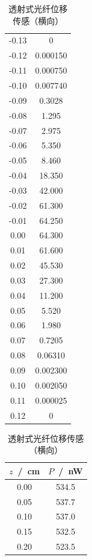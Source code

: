 \documentclass[a4paper]{article}%
\begin{document}
\begin{table}[H]
\begin{minipage}{0.29\linewidth}
\begin{tabular}{cc}
          \midrule
          -0.13 	&	0	\\
          -0.12 	&	0.000150 	\\
          -0.11 	&	0.000750 	\\
          -0.10 	&	0.007740 	\\
          -0.09 	&	0.3028 	\\
          -0.08 	&	1.295 	\\
          -0.07 	&	2.975 	\\
          -0.06 	&	5.350 	\\
          -0.05 	&	8.460 	\\
          -0.04 	&	18.350 	\\
          -0.03 	&	42.000 	\\
          -0.02 	&	61.300 	\\
          -0.01 	&	64.250 	\\
          0.00 	&	64.300 	\\
          0.01 	&	61.600 	\\
          0.02 	&	45.530 	\\
          0.03 	&	27.300 	\\
          0.04 	&	11.200 	\\
          0.05 	&	5.520 	\\
          0.06 	&	1.980 	\\
          0.07 	&	0.7205 	\\
          0.08 	&	0.06310 	\\
          0.09 	&	0.002300 	\\
          0.10 	&	0.002050 	\\
          0.11 	&	0.000025 	\\
          0.12 	&	0	\\
          \bottomrule
      \end{tabular}
      \caption{透射式光纤位移传感（横向）}\label{002}
  \end{minipage}
  \begin{minipage}{0.29\linewidth}
    \centering
    \begin{tabular}{cc}
        \toprule
        $z$~/~cm & $P$~/~nW\\
        \midrule
        0.00 	&	534.5 	\\
        0.05 	&	537.7 	\\
        0.10 	&	537.0 	\\
        0.15 	&	532.5 	\\
        0.20 	&	523.5 	\\

\end{tabular}
\end{minipage}
\end{table}
\end{document}
